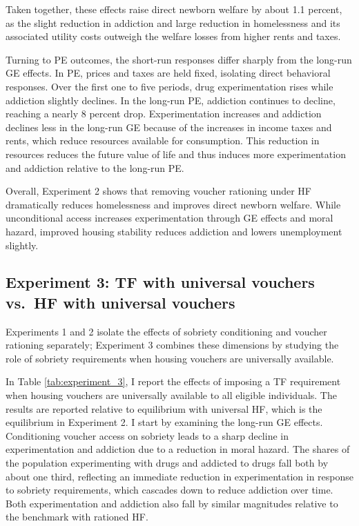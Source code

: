 \documentclass[parskip=full]{article}
\theoremstyle{plain}
\theoremstyle{definition}
\theoremstyle{remark}
\begin{document}
Taken together, these effects raise direct newborn welfare by about 1.1 percent, as the slight reduction in addiction and large reduction in homelessness and its associated utility costs outweigh the welfare losses from higher rents and taxes.

Turning to PE outcomes, the short-run responses differ sharply from the long-run GE effects. In PE, prices and taxes are held fixed, isolating direct behavioral responses. Over the first one to five periods, drug experimentation rises while addiction slightly declines. In the long-run PE, addiction continues to decline, reaching a nearly 8 percent drop. Experimentation increases and addiction declines less in the long-run GE because of the increases in income taxes and rents, which reduce resources available for consumption. This reduction in resources reduces the future value of life and thus induces more experimentation and addiction relative to the long-run PE.

Overall, Experiment 2 shows that removing voucher rationing under HF dramatically reduces homelessness and improves direct newborn welfare. While unconditional access increases experimentation through GE effects and moral hazard, improved housing stability reduces addiction and lowers unemployment slightly.

\subsection{Experiment 3: TF with universal vouchers vs.\ HF with universal vouchers}\label{sec:exp_3}

Experiments 1 and 2 isolate the effects of sobriety conditioning and voucher rationing separately; Experiment 3 combines these dimensions by studying the role of sobriety requirements when housing vouchers are universally available.

In Table \ref{tab:experiment_3}, I report the effects of imposing a TF requirement when housing vouchers are universally available to all eligible individuals. The results are reported relative to equilibrium with universal HF, which is the equilibrium in Experiment 2. I start by examining the long-run GE effects. Conditioning voucher access on sobriety leads to a sharp decline in experimentation and addiction due to a reduction in moral hazard. The shares of the population experimenting with drugs and addicted to drugs fall both by about one third, reflecting an immediate reduction in experimentation in response to sobriety requirements, which cascades down to reduce addiction over time. Both experimentation and addiction also fall by similar magnitudes relative to the benchmark with rationed HF.  
\end{document}
